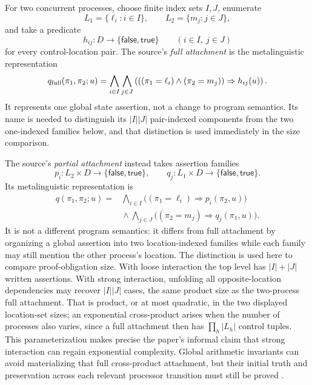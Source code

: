 For two concurrent processes, choose finite index sets \(I,J\), enumerate
\[
 L_1=\{\ell_i:i\in I\},
 \qquad L_2=\{m_j:j\in J\},
\]
 and take a predicate
\[
 h_{ij}:D\to\{\mathsf{false},\mathsf{true}\}
 \qquad(i\in I,\ j\in J)
\]
for every control-location pair.  The source's \emph{full attachment} is the
metalinguistic representation
\[
 q_{\rm full}(\pi_1,\pi_2;u)
 =\bigwedge_{i\in I}\bigwedge_{j\in J}
 \left(
   ((\pi_1=\ell_i)\land(\pi_2=m_j))\Rightarrow h_{ij}(u)
 \right).
\]
It represents one global state assertion, not a change to program semantics.
Its name is needed to distinguish its \(|I||J|\) pair-indexed components from
the two one-indexed families below, and that distinction is used immediately
in the size comparison.

The source's \emph{partial attachment} instead takes assertion families
\[
 p_i:L_2\times D\to\{\mathsf{false},\mathsf{true}\},
 \qquad
 q_j:L_1\times D\to\{\mathsf{false},\mathsf{true}\}.
\]
Its metalinguistic representation is
\[
\begin{split}
q(\pi_1,\pi_2;u)
={}&\bigwedge_{i\in I}
  \bigl((\pi_1=\ell_i)\Rightarrow p_i(\pi_2,u)\bigr)\\
 &{}\land
 \bigwedge_{j\in J}
  \bigl((\pi_2=m_j)\Rightarrow q_j(\pi_1,u)\bigr).
\end{split}
\]
It is not a different program semantics: it differs from full attachment by
organizing a global assertion into two location-indexed families while each
family may still mention the other process's location.  The distinction is
used here to compare proof-obligation size.  With loose interaction the top
level has \(|I|+|J|\) written assertions.  With strong interaction, unfolding
all opposite-location dependencies may recover \(|I||J|\) cases, the same
product size as the two-process full attachment.  That is product, or at most
quadratic, in the two displayed location-set sizes; an exponential
cross-product arises when the number of processes also varies, since a full
attachment then has \(\prod_h|L_h|\) control tuples.  This parameterization
makes precise the paper's informal claim that strong interaction can regain
exponential complexity.  Global arithmetic invariants can avoid materializing
that full cross-product attachment, but their initial truth and preservation
across each relevant processor transition must still be proved
\cite[p.~51]{Pnueli1977}.

